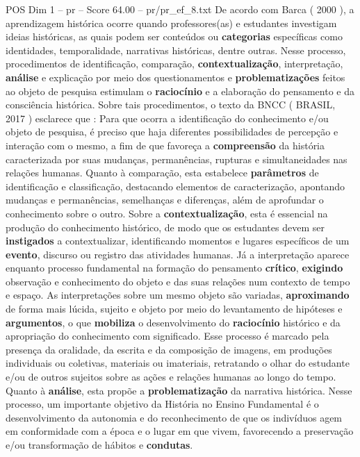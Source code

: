\begin{textsample}{POS Dim 1 – pr – Score 64.00 – pr/pr\_ef\_8.txt}
De acordo com Barca ( 2000 ), a aprendizagem histórica ocorre quando professores(as) e estudantes investigam ideias históricas, as quais podem ser conteúdos ou \textbf{categorias} específicas como identidades, temporalidade, narrativas históricas, dentre outras.
Nesse processo, procedimentos de identificação, comparação, \textbf{contextualização}, interpretação, \textbf{análise} e explicação por meio dos questionamentos e \textbf{problematizações} feitos ao objeto de pesquisa estimulam o \textbf{raciocínio} e a elaboração do pensamento e da consciência histórica.
Sobre tais procedimentos, o texto da BNCC ( BRASIL, 2017 ) esclarece que : Para que ocorra a identificação do conhecimento e/ou objeto de pesquisa, é preciso que haja diferentes possibilidades de percepção e interação com o mesmo, a fim de que favoreça a \textbf{compreensão} da história caracterizada por suas mudanças, permanências, rupturas e simultaneidades nas relações humanas.
Quanto à comparação, esta estabelece \textbf{parâmetros} de identificação e classificação, destacando elementos de caracterização, apontando mudanças e permanências, semelhanças e diferenças, além de aprofundar o conhecimento sobre o outro.
Sobre a \textbf{contextualização}, esta é essencial na produção do conhecimento histórico, de modo que os estudantes devem ser \textbf{instigados} a contextualizar, identificando momentos e lugares específicos de um \textbf{evento}, discurso ou registro das atividades humanas.
Já a interpretação aparece enquanto processo fundamental na formação do pensamento \textbf{crítico}, \textbf{exigindo} observação e conhecimento do objeto e das suas relações num contexto de tempo e espaço.
As interpretações sobre um mesmo objeto são variadas, \textbf{aproximando} de forma mais lúcida, sujeito e objeto por meio do levantamento de hipóteses e \textbf{argumentos}, o que \textbf{mobiliza} o desenvolvimento do \textbf{raciocínio} histórico e da apropriação do conhecimento com significado.
Esse processo é marcado pela presença da oralidade, da escrita e da composição de imagens, em produções individuais ou coletivas, materiais ou imateriais, retratando o olhar do estudante e/ou de outros sujeitos sobre as ações e relações humanas ao longo do tempo.
Quanto à \textbf{análise}, esta propõe a \textbf{problematização} da narrativa histórica.
Nesse processo, um importante objetivo da História no Ensino Fundamental é o desenvolvimento da autonomia e do reconhecimento de que os indivíduos agem em conformidade com a época e o lugar em que vivem, favorecendo a preservação e/ou transformação de hábitos e \textbf{condutas}.

\end{textsample}
